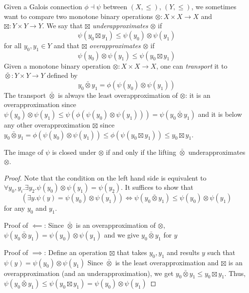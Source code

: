 \documentclass{llncs}
\begin{document}
Given a Galois connection $\phi \dashv \psi$ between $(X, \leq)$,
$(Y, \leq)$, we sometimes want to compare two monotone binary
operations ${\otimes} : X \times X \to X$ and
${\boxtimes} : Y \times Y \to Y$. We say that $\boxtimes$
\emph{underapproximates} $\otimes$ if
\[
\psi(y_0 \boxtimes y_1) \leq \psi(y_0) \otimes \psi(y_1) 
\]  
for all $y_0, y_1 \in Y$ and that $\boxtimes$ \emph{overapproximates}
$\otimes$ if
\[
\psi(y_0) \otimes \psi(y_1) \leq \psi(y_0 \boxtimes y_1) 
\]  
Given a monotone binary operation $\otimes : X \times X \to X$, one
can \emph{transport} it to $\bar{\otimes} : Y \times Y \to Y$ defined
by
\[
y_0 \mathbin{\bar{\otimes}} y_1 = \phi(\psi(y_0) \otimes \psi(y_1)) 
\]
The transport $\bar{\otimes}$ is always the least overapproximation of
$\otimes$: it is an overapproximation since
$\psi(y_0) \otimes \psi(y_1) \leq \psi(\phi(\psi(y_0) \otimes
\psi(y_1))) = \psi(y_0 \mathbin{\bar{\otimes}} y_1)$ and it is below
any other overapproximation ${\boxtimes}$ since
$y_0 \mathbin{\bar{\otimes}} y_1 = \phi(\psi(y_0) \otimes \psi(y_1))
\leq \phi(\psi(y_0 \boxtimes y_1)) \leq y_0 \boxtimes y_1$.

\begin{lemma}\label{lem:closedness-lifting-underapproximation}
  The image of $\psi$ is closed under $\otimes$ if and only if the lifting $\bar{\otimes}$ underapproximates $\otimes$.
  \begin{proof}
    Note that the condition on the left hand side is equivalent to $\forall y_{0}, y_{i}. \exists y_{2}. \psi(y_{0}) \otimes \psi (y_{1}) = \psi (y_{2})$.
    It suffices to show that
    \[
      (\exists y. \psi (y) = \psi(y_{0}) \otimes \psi (y_{1}) ) \iff \psi (y_{0} \bar{\otimes} y_{1}) \leq \psi (y_{0}) \otimes \psi (y_{1})
    \]
    for any $y_{0}$ and $y_{1}$.

    Proof of $\impliedby$: Since $\bar{\otimes}$ is an overapproximation of $\otimes$,
    $\psi (y_{0} \bar{\otimes} y_{1}) = \psi (y_{0}) \otimes \psi (y_{1})$ and we give $y_{0} \bar{\otimes} y_{1}$ for $y$

    Proof of $\implies$:
    Define an operation $\boxtimes$ that takes $y_{0}, y_{1}$ and results $y$ such that $\psi(y) = \psi(y_{0}) \otimes \psi(y_{1})$
    Since $\bar{\otimes}$ is the least overapproximation and $\boxtimes$ is an overapproximation (and an underapproximation), we get
    $y_{0} \bar{\otimes} y_{1} \leq y_{0} \boxtimes y_{1} $. Thus, $\psi(y_{0} \bar{\otimes} y_{1}) \leq \psi(y_{0} \boxtimes y_{1}) = \psi(y_{0}) \otimes \psi (y_{1})$
  \end{proof}
\end{lemma}
\end{document}
